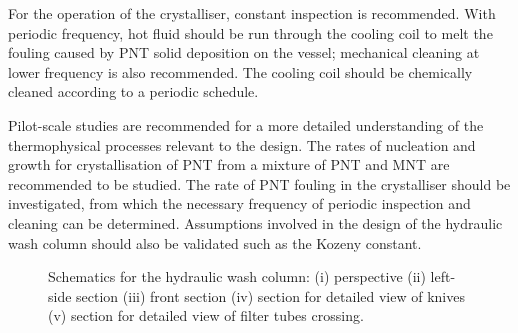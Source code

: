For the operation of the crystalliser, constant inspection is recommended. With periodic frequency, hot fluid should be run through the cooling coil to melt the fouling caused by PNT solid deposition on the vessel; mechanical cleaning at lower frequency is also recommended. The cooling coil should be chemically cleaned according to a periodic schedule. 

Pilot-scale studies are recommended for a more detailed understanding of the thermophysical processes relevant to the design. The rates of nucleation and growth for crystallisation of PNT from a mixture of PNT and MNT are recommended to be studied. The rate of PNT fouling in the crystalliser should be investigated, from which the necessary frequency of periodic inspection and cleaning can be determined. Assumptions involved in the design of the hydraulic wash column should also be validated such as the Kozeny constant.   

\begin{figure}[H]
    \centering
    
    \caption{Schematics for the hydraulic wash column: (i) perspective (ii) left-side section (iii) front section (iv) section for detailed view of knives (v) section for detailed view of filter tubes crossing.}
    \label{fig:wash column schematic}
\end{figure}





